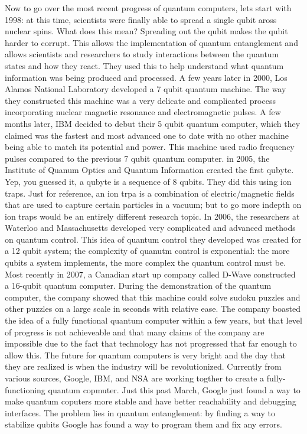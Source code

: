 \documentclass[11pt]{article}
\begin{document}
\indent Now to go over the most recent progress of quantum computers, lets start with 1998: at this time, scientists were finally able to spread a single qubit aross nuclear spins. What does this mean? Spreading out the qubit makes the qubit harder to corrupt. This allows the implementation of quantum entanglement and allows scientists and researchers to study interactions between the quantum states and how they react. They used this to help understand what quantum information was being produced and processed. A few years later in 2000, Los Alamos National Laboratory developed a 7 qubit quantum machine. The way they constructed this machine was a very delicate and complicated process incorporating nuclear magnetic resonance and electromagnetic pulses. A few months later, IBM decided to debut their 5 qubit quantum computer, which they claimed was the fastest and most advanced one to date with no other machine being able to match its potential and power. This machine used radio frequency pulses compared to the previous 7 qubit quantum computer. in 2005, the Institute of Quanum Optics and Quantum Information created the first qubyte. Yep, you guessed it, a qubyte is a sequence of 8 qubits. They did this using ion traps. Just for reference, an ion trpa is a combination of electric/magnetic fields that are used to capture certain particles in a vacuum; but to go more indepth on ion traps would be an entirely different research topic. In 2006, the researchers at Waterloo and Massachusetts developed very complicated and advanced methods on quantum control. This idea of quantum control they developed was created for a 12 qubit system; the complexity of quanutm control is exponential: the more qubits a system implements, the more complex the quantum control must be. Most recently in 2007, a Canadian start up company called D-Wave constructed a 16-qubit quantum computer. During the demonstration of the quantum computer, the company showed that this machine could solve sudoku puzzles and other puzzles on a large scale in seconds with relative ease. The company boasted the idea of a fully functional quantum computer within a few years, but that level of progress is not achieveable and that many claims of the company are impossible due to the fact that technology has not progressed that far enough to allow this. The future for quantum computers is very bright and the day that they are realized is when the industry will be revolutionized. Currently from various sources, Google, IBM, and NSA are working togther to create a fully-functioning quantum copmuter. Just this past March, Google just found a way to make quantum coputers more stable and have better reachability and debugging interfaces. The problem lies in quantum entanglement: by finding a way to stabilize qubits Google has found a way to program them and fix any errors.\\
\end{document}
